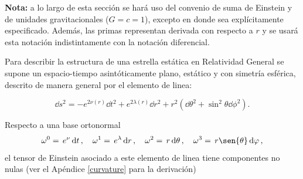 

\noindent\small{\textbf{Nota:} a lo largo de esta sección se hará uso del convenio de suma de Einstein y de unidades gravitacionales ($G=c=1$), excepto en donde sea explícitamente especificado. Además, las primas representan derivada con respecto a $r$ y se usará esta notación indistintamente con la notación diferencial.}
\normalsize

\noindent Para describir la estructura de una estrella estática en Relatividad General se supone un espacio-tiempo asintóticamente plano, estático y con simetría esférica, descrito de manera general por el elemento de linea:

\begin{equation}
\dd{s}^ { 2 } = -e ^ { 2 \nu ( r ) } \dd{ t} ^ { 2 } + e ^ { 2 \lambda ( r ) } \dd{ r} ^ { 2 } + r ^ { 2 } \left( \dd{ \theta} ^ { 2 } + \sin ^ { 2 }  \theta  \dd{ \phi} ^ { 2 } \right) .   
\end{equation}

Respecto a una base ortonormal
\begin{equation}
    \omega^0=\,e^{\nu}\dd{t}, \quad
    \omega^1=\,e^{\lambda}\dd{r}, \quad
    \omega^2=\,r\dd{\theta}, \quad
    \omega^3=\,r\sen{\theta}\dd{\varphi},
\end{equation}
el tensor de Einstein asociado a este elemento de linea tiene componentes no nulas (ver el Apéndice \ref{curvature} para la derivación)

